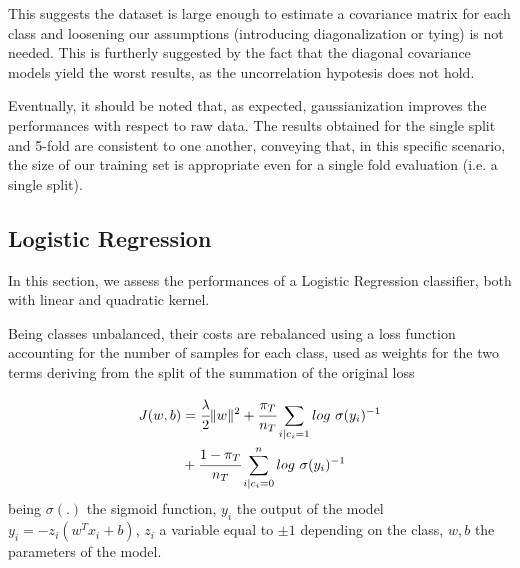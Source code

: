 This suggests the dataset is large enough to estimate a covariance matrix for each class and loosening our assumptions (introducing diagonalization or tying) is not needed. This is furtherly suggested by the fact that the diagonal covariance models yield the worst results, as the uncorrelation hypotesis does not hold.

Eventually, it should be noted that, as expected, gaussianization improves the performances with respect to raw data. The results obtained for the single split and 5-fold are consistent to one another, conveying that, in this specific scenario, the size of our training set is appropriate even for a single fold evaluation (i.e. a single split).

\subsection{Logistic Regression}

In this section, we assess the performances of a Logistic Regression classifier, both with linear and quadratic kernel.

Being classes unbalanced, their costs are rebalanced using a loss function accounting for the number of samples for each class, used as weights for the two terms deriving from the split of the summation of the original loss

\begin{align*}
	J(w, b) &= \cfrac{\lambda}{2} \|w\|^2 + \cfrac{\pi_T}{n_T} \sum_{i|c_i=1} log \ \sigma(y_i)^{-1} 
	\\ &+ \cfrac{1 - \pi_T}{n_T} \sum^n_{i| c_i=0} log \ \sigma(y_i)^{-1} 
\end{align*}
being $\sigma(.)$ the sigmoid function, $y_i$ the output of the model $y_i = - z_i (w^T x_i + b)$, $z_i$ a variable equal to $\pm 1$ depending on the class, $w, b$ the parameters of the model. 

